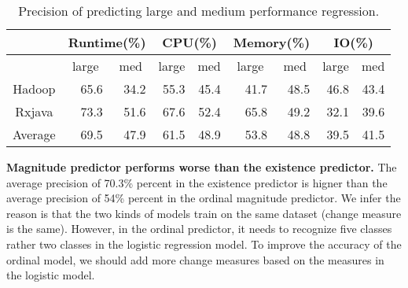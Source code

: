 \begin{table}[]
	\centering
	\footnotesize
	\caption{Precision of predicting large and medium performance regression.}
	\label{tab:preeffect}
\begin{tabular}{|c|r|r|r|r|r|r|r|r|}
	\hline
	& \multicolumn{2}{c|}{Runtime(\%)}                      & \multicolumn{2}{c|}{CPU(\%)}                          & \multicolumn{2}{c|}{Memory(\%)}                       & \multicolumn{2}{c|}{IO(\%)}                           \\ \hline
	& \multicolumn{1}{c|}{large} & \multicolumn{1}{c|}{med} & \multicolumn{1}{c|}{large} & \multicolumn{1}{c|}{med} & \multicolumn{1}{c|}{large} & \multicolumn{1}{c|}{med} & \multicolumn{1}{c|}{large} & \multicolumn{1}{c|}{med} \\ \hline
	Hadoop                        & 65.6                       & 34.2                     & 55.3                       & 45.4                     & 41.7                       & 48.5                     & 46.8                       & 43.4                     \\ \hline
	Rxjava                        & 73.3                       & 51.6                     & 67.6                       & 52.4                     & 65.8                       & 49.2                     & 32.1                       & 39.6                     \\ \hline
	\multicolumn{1}{|l|}{Average} & 69.5                       & 47.9                     & 61.5                       & 48.9                     & 53.8                       & 48.8                     & 39.5                       & 41.5                     \\ \hline
\end{tabular}
\end{table}

\textbf{Magnitude predictor performs worse than the existence predictor.} The average precision of 70.3\% percent in the existence predictor is higner than the average precision of 54\% percent in the ordinal magnitude predictor. We infer the reason is that the two kinds of models train on the same dataset (change measure is the same). However, in the ordinal predictor, it needs to recognize five classes rather two classes in the logistic regression model. To improve the accuracy of the ordinal model, we should add more change measures based on the measures in the logistic model.


